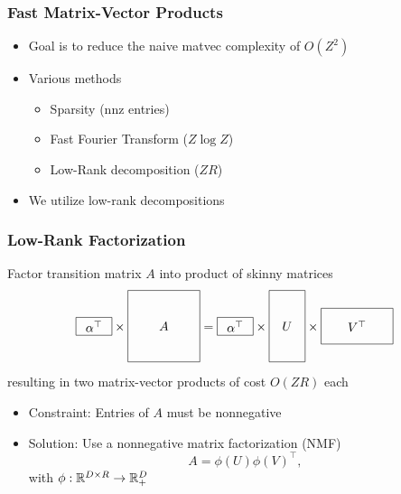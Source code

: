 \documentclass{beamer}
\begin{document}
\begin{frame}
\frametitle{Fast Matrix-Vector Products}
\begin{itemize}
\item Goal is to reduce the naive matvec complexity of $O(Z^2)$
\vspace{2em}
\item Various methods
    \vspace{1em}
    \begin{itemize}
    \item Sparsity (nnz entries)
    \vspace{1em}
    \item Fast Fourier Transform ($Z \log Z$)
    \vspace{1em}
    \item Low-Rank decomposition ($ZR$)
    \end{itemize}
\vspace{2em}
\item We utilize low-rank decompositions
\end{itemize}
\end{frame}

\begin{frame}
\frametitle{Low-Rank Factorization}
Factor transition matrix $A$ into product of skinny matrices
\[
\vcenter{\hbox{\begin{tikzpicture}[baseline=-0.5ex]
    \draw (0,0) rectangle (1,.5) node[pos=.5] {$\alpha^\top$};
\end{tikzpicture}}}
\times
\vcenter{\hbox{\begin{tikzpicture}[baseline=-0.5ex]
    \draw (0,0) rectangle (2,2) node[pos=.5] {$A$};
\end{tikzpicture}}}
=
\vcenter{\hbox{\begin{tikzpicture}[baseline=-0.5ex]
    \draw (0,0) rectangle (1,.5) node[pos=.5] {$\alpha^\top$};
\end{tikzpicture}}}
\times
\vcenter{\hbox{\begin{tikzpicture}[baseline=-0.5ex]
    \draw (0,0) rectangle (1,2) node[pos=.5] {$U$};
\end{tikzpicture}}}
\times 
\vcenter{\hbox{\begin{tikzpicture}[baseline=-0.5ex]
    \draw (0,0) rectangle (2,1) node[pos=.5] {$V^\top$};
\end{tikzpicture}}}
\]
resulting in two matrix-vector products of cost $O(ZR)$ each
\vspace{1em}
\begin{itemize}
\item Constraint: Entries of $A$ must be nonnegative
\vspace{1em}
\item Solution: Use a nonnegative matrix factorization (NMF)
$$A = \phi(U)\phi(V)^\top,$$
with $\phi:\mathbb{R}^{D\times R}\to\mathbb{R}_+^{D}$
\end{itemize}
\end{frame}
\end{document}
